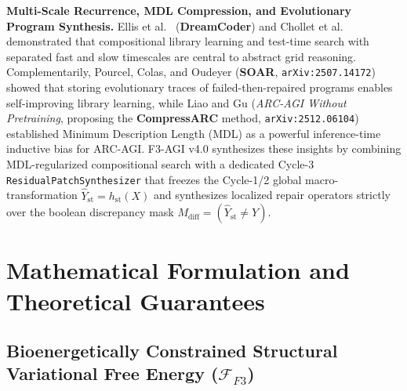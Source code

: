 \documentclass[10pt,a4paper]{article}
\begin{document}
\textbf{Multi-Scale Recurrence, MDL Compression, and Evolutionary Program Synthesis.}
Ellis et al.\ \cite{ellis2021dreamcoder} (\textbf{DreamCoder}) and Chollet et al.\ \cite{chollet2025arcprize} demonstrated that compositional library learning and test-time search with separated fast and slow timescales are central to abstract grid reasoning. Complementarily, Pourcel, Colas, and Oudeyer \cite{pourcel2025soar} (\textbf{SOAR}, \texttt{arXiv:2507.14172}) showed that storing evolutionary traces of failed-then-repaired programs enables self-improving library learning, while Liao and Gu \cite{liao2025compressarc} (\emph{ARC-AGI Without Pretraining}, proposing the \textbf{CompressARC} method, \texttt{arXiv:2512.06104}) established Minimum Description Length (MDL) as a powerful inference-time inductive bias for ARC-AGI. F3-AGI v4.0 synthesizes these insights by combining MDL-regularized compositional search with a dedicated Cycle-3 \texttt{ResidualPatchSynthesizer} that freezes the Cycle-1/2 global macro-transformation $\hat{Y}_{\text{st}} = h_{\text{st}}(X)$ and synthesizes localized repair operators strictly over the boolean discrepancy mask $M_{\text{diff}} = (\hat{Y}_{\text{st}} \neq Y)$.

\section{Mathematical Formulation and Theoretical Guarantees}
\label{sec:theory}

\subsection{Bioenergetically Constrained Structural Variational Free Energy ($\mathcal{F}_{F3}$)}
\end{document}
